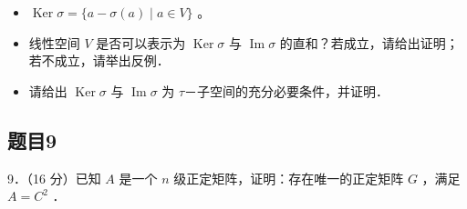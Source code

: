 \documentclass{article}
\begin{document}
\begin{itemize}
  \item[（1）] \(\operatorname{Ker} \sigma=\{a-\sigma(a) \mid a \in V\}\) 。
  \item[（2）] 线性空间 \(V\) 是否可以表示为 \(\operatorname{Ker} \sigma\) 与 \(\operatorname{Im} \sigma\) 的直和？若成立，请给出证明；若不成立，请举出反例．
  \item[（3）] 请给出 \(\operatorname{Ker} \sigma\) 与 \(\operatorname{Im} \sigma\) 为 \(\tau\)－子空间的充分必要条件，并证明．
\end{itemize}

\subsection{题目9}
9．（16 分）已知 \(A\) 是一个 \(n\) 级正定矩阵，证明：存在唯一的正定矩阵 \(G\) ，满足 \(A=C^{2}\) ．
\end{document}
